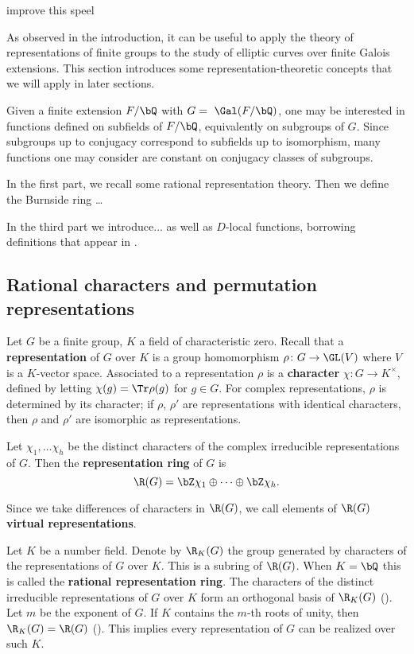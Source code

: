 {\color{red} improve this speel}

As observed in the introduction, it can be useful to apply the theory of representations of finite groups to the study of elliptic curves over finite Galois extensions. This section introduces some representation-theoretic concepts that we will apply in later sections. 

Given a finite extension $F / \bQ$ with $G = \ \Gal(F / \bQ)$, one may be interested in functions defined on subfields of $F / \bQ$, equivalently on subgroups of $G$. Since subgroups up to conjugacy correspond to subfields up to isomorphism, many functions one may consider are constant on conjugacy classes of subgroups. 

In the first part, we recall some rational representation theory. Then we define the Burnside ring{\color{red} \ldots}

In the third part we introduce... as well as $D$-local functions, borrowing definitions that appear in \cite[Section 2.iii]{reg-const}.

\subsection{Rational characters and permutation representations}\label{rep}

Let $G$ be a finite group, $K$ a field of characteristic zero. Recall that a \textbf{representation} of $G$ over $K$ is a group homomorphism $\rho \colon G \to \GL(V)$ where $V$ is a $K$-vector space. Associated to a representation $\rho$ is a \textbf{character} $\chi \colon G \to K^{\times}$, defined by letting $\chi(g) = \Tr \rho(g)$ for $g \in G$. For complex representations, $\rho$ is determined by its character; if $\rho$, $\rho'$ are representations with identical characters, then $\rho$ and $\rho'$ are isomorphic as representations. 

\begin{defn}
Let $\chi_1, \ldots \chi_h$ be the distinct characters of the complex irreducible representations of $G$. 
Then the \textbf{representation ring} of $G$ is 
\[ \R(G) = \bZ \chi_1 \oplus \cdots \oplus \bZ \chi_h .\]
\end{defn}

Since we take differences of characters in $\R(G)$, we call elements of $\R(G)$ \textbf{virtual representations}. 

Let $K$ be a number field. Denote by $\R_K(G)$ the group generated by characters of the representations of $G$ over $K$. This is a subring of $\R(G)$.
When $K = \bQ$ this is called the \textbf{rational representation ring}.
The characters of the distinct irreducible representations of $G$ over $K$ form an orthogonal basis of $\R_K(G)$ (\cite[Proposition 32]{Serre}).
Let $m$ be the exponent of $G$. If $K$ contains the $m$-th roots of unity, then $\R_K(G) = \R(G)$ (\cite[Theorem 24]{Serre}). This implies every representation of $G$ can be realized over such $K$. 
\vspace{1em}

